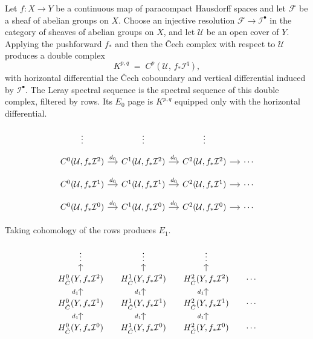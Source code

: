 \begin{example}
Let $f : X \to Y$ be a continuous map of paracompact Hausdorff spaces
and let $\mathcal{F}$ be a sheaf of abelian groups on $X$. Choose an
injective resolution $\mathcal{F} \to \mathcal{I}^\bullet$ in the
category of sheaves of abelian groups on $X$, and let $\mathcal{U}$
be an open cover of $Y$. Applying the pushforward $f_*$ and then the
\v{C}ech complex with respect to $\mathcal{U}$ produces a double
complex
\[
  K^{p,q} \;=\; C^p(\mathcal{U},\, f_* \mathcal{I}^q),
\]
with horizontal differential the \v{C}ech coboundary and vertical
differential induced by $\mathcal{I}^\bullet$. The Leray spectral
sequence is the spectral sequence of this double complex, filtered
by rows. Its $E_0$ page is $K^{p,q}$ equipped only with the
horizontal differential. 

  \[
\begin{tikzcd}[column sep=small, row sep=small]
\vdots & \vdots & \vdots & \\
C^0(\mathcal{U}, f_*\mathcal{I}^2) \ar[r, "d_0"] & C^1(\mathcal{U}, f_*\mathcal{I}^2) \ar[r, "d_0"] & C^2(\mathcal{U}, f_*\mathcal{I}^2) \ar[r] & \cdots \\
C^0(\mathcal{U}, f_*\mathcal{I}^1) \ar[r, "d_0"] & C^1(\mathcal{U}, f_*\mathcal{I}^1) \ar[r, "d_0"] & C^2(\mathcal{U}, f_*\mathcal{I}^1) \ar[r] & \cdots \\
C^0(\mathcal{U}, f_*\mathcal{I}^0) \ar[r, "d_0"] & C^1(\mathcal{U}, f_*\mathcal{I}^0) \ar[r, "d_0"] & C^2(\mathcal{U}, f_*\mathcal{I}^0) \ar[r] & \cdots
\end{tikzcd}
\]



Taking cohomology of the rows produces
$E_1$.

\[
\begin{tikzcd}[column sep=small, row sep=small]
\vdots & \vdots & \vdots & \\
H^0_{\check{C}}(Y, f_*\mathcal{I}^2) \ar[u] & H^1_{\check{C}}(Y, f_*\mathcal{I}^2) \ar[u] & H^2_{\check{C}}(Y, f_*\mathcal{I}^2) \ar[u] & \cdots \\
H^0_{\check{C}}(Y, f_*\mathcal{I}^1) \ar[u, "d_1"] & H^1_{\check{C}}(Y, f_*\mathcal{I}^1) \ar[u, "d_1"] & H^2_{\check{C}}(Y, f_*\mathcal{I}^1) \ar[u, "d_1"] & \cdots \\
H^0_{\check{C}}(Y, f_*\mathcal{I}^0) \ar[u, "d_1"] & H^1_{\check{C}}(Y, f_*\mathcal{I}^0) \ar[u, "d_1"] & H^2_{\check{C}}(Y, f_*\mathcal{I}^0) \ar[u, "d_1"] & \cdots
\end{tikzcd}
\]



\end{example}
